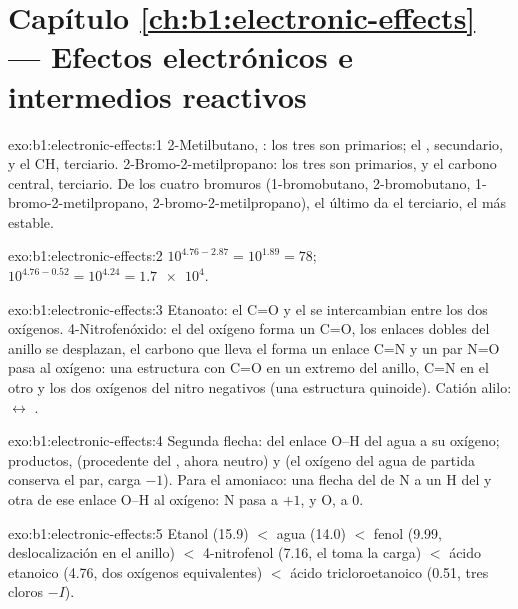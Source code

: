 \section*{Capítulo \ref{ch:b1:electronic-effects} --- Efectos electrónicos e intermedios reactivos}

\begin{solution}{exo:b1:electronic-effects:1}
2-Metilbutano, : los tres  son primarios;
el , secundario, y el CH, terciario. 2-Bromo-2-metilpropano: los
tres  son primarios, y el carbono central, terciario. De los
cuatro bromuros  (1-bromobutano, 2-bromobutano,
1-bromo-2-metilpropano, 2-bromo-2-metilpropano), el último da el
 terciario, el más estable.
\end{solution}

\begin{solution}{exo:b1:electronic-effects:2}
$10^{4.76 - 2.87} = 10^{1.89} = 78$; $10^{4.76 - 0.52} = 10^{4.24} =
\num{1.7e4}$.
\end{solution}

\begin{solution}{exo:b1:electronic-effects:3}
Etanoato: el C=O y el  se intercambian entre los dos oxígenos.
4-Nitrofenóxido: el  del oxígeno forma un C=O, los
enlaces dobles del anillo se desplazan, el carbono que lleva el 
forma un enlace C=N y un par N=O pasa al oxígeno: una estructura con C=O
en un extremo del anillo, C=N en el otro y los dos oxígenos del nitro
negativos (una estructura quinoide). Catión alilo:
 $\leftrightarrow$ .
\end{solution}

\begin{solution}{exo:b1:electronic-effects:4}
Segunda flecha: del enlace O--H del agua a su oxígeno; productos,
 (procedente del , ahora neutro) y  (el oxígeno
del agua de partida conserva el par, carga $-1$). Para el amoniaco: una
flecha del  de N a un H del  y otra de ese
enlace O--H al oxígeno: N pasa a $+1$, y O, a 0.
\end{solution}

\begin{solution}{exo:b1:electronic-effects:5}
Etanol (15.9) $<$ agua (14.0) $<$ fenol (9.99, deslocalización en el
anillo) $<$ 4-nitrofenol (7.16, el  toma la carga) $<$ ácido
etanoico (4.76, dos oxígenos equivalentes) $<$ ácido tricloroetanoico
(0.51, tres cloros $-I$).
\end{solution}

